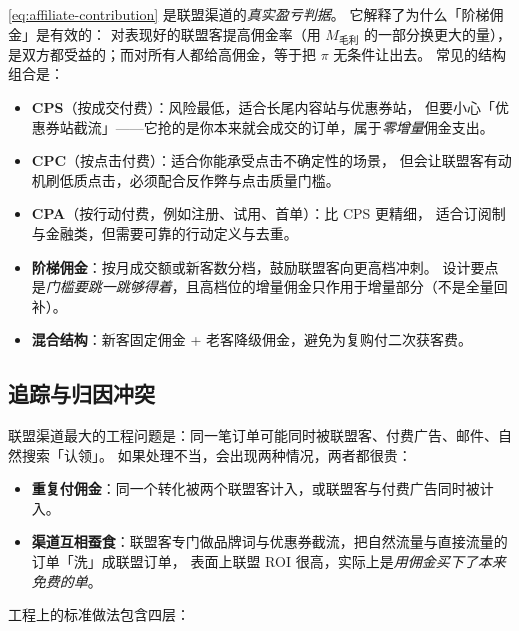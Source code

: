 \cref{eq:affiliate-contribution} 是联盟渠道的\emph{真实盈亏判据}。
它解释了为什么「阶梯佣金」是有效的：
对表现好的联盟客提高佣金率（用 $M_{\text{毛利}}$ 的一部分换更大的量），
是双方都受益的；而对所有人都给高佣金，等于把 $\pi$ 无条件让出去。
常见的结构组合是：

\begin{itemize}
  \item \textbf{CPS}（按成交付费）：风险最低，适合长尾内容站与优惠券站，
        但要小心「优惠券站截流」——它抢的是你本来就会成交的订单，属于\emph{零增量}佣金支出。
  \item \textbf{CPC}（按点击付费）：适合你能承受点击不确定性的场景，
        但会让联盟客有动机刷低质点击，必须配合反作弊与点击质量门槛。
  \item \textbf{CPA}（按行动付费，例如注册、试用、首单）：比 CPS 更精细，
        适合订阅制与金融类，但需要可靠的行动定义与去重。
  \item \textbf{阶梯佣金}：按月成交额或新客数分档，鼓励联盟客向更高档冲刺。
        设计要点是\emph{门槛要跳一跳够得着}，且高档位的增量佣金只作用于增量部分（不是全量回补）。
  \item \textbf{混合结构}：新客固定佣金 + 老客降级佣金，避免为复购付二次获客费。
\end{itemize}

\subsection{追踪与归因冲突}

联盟渠道最大的工程问题是：同一笔订单可能同时被联盟客、付费广告、邮件、自然搜索「认领」。
如果处理不当，会出现两种情况，两者都很贵：

\begin{itemize}
  \item \textbf{重复付佣金}：同一个转化被两个联盟客计入，或联盟客与付费广告同时被计入。
  \item \textbf{渠道互相蚕食}：联盟客专门做品牌词与优惠券截流，把自然流量与直接流量的订单「洗」成联盟订单，
        表面上联盟 ROI 很高，实际上是\emph{用佣金买下了本来免费的单}。
\end{itemize}

工程上的标准做法包含四层：

